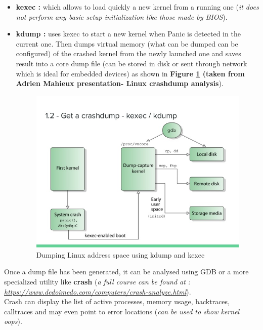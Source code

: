 \begin{itemize}
\begin{itemize}
	
	\item \textbf{kexec : } which allows to load quickly a new kernel from a running one (\textit{it does not perform any basic setup initialization like those made by BIOS}).
	\item \textbf{kdump : } uses kexec to start a new kernel when Panic is detected in the current one. Then dumps virtual memory (what can be dumped can be configured) of the crashed kernel from the newly launched one and saves result into a core dump file (can be stored in disk or sent through network which is ideal for embedded devices) as shown in \textbf{Figure \ref{Dumping Linux address space using kdump and kexec} (taken from Adrien Mahieux presentation- Linux crashdump analysis}). 
	\begin{figure}[H]
		\centering
        \includegraphics[scale=0.55]{img/solution/kdump-kexec.jpg}
        \caption{Dumping Linux address space using kdump and kexec}
        \label{Dumping Linux address space using kdump and kexec}
    \end{figure}

\end{itemize}




Once a dump file has been generated, it can be analysed using GDB or a more specialized utility like \textbf{crash} (\textit{a full course can be found at : {\color{blue}\url{https://www.dedoimedo.com/computers/crash-analyze.html}}}).\\
Crash can display the list of active processes, memory usage, backtraces, calltraces and may even point to error locations (\emph{can be used to show kernel oops}).
	
\end{itemize}


